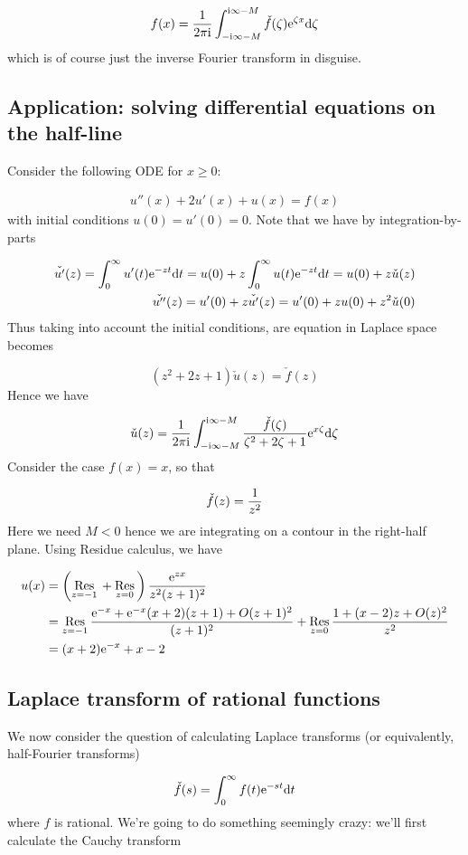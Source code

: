 \documentclass[12pt,a4paper]{article}
\def\D{ {\rm d} }
\def\I{ {\rm i} }
\def\E{ {\rm e} }
\def\Res_#1{\underset{#1}{\rm Res}\,}
\def\dt{\D t}
\begin{document}
\[
f(x) = {1 \over 2 \pi \I} \int_{-\I \infty - M}^{\I \infty - M}  \check f(\zeta) \E^{\zeta x} \D \zeta
\]
which is of course just the inverse Fourier transform in disguise.

\subsection{Application: solving differential equations on the half-line}
Consider the following ODE for $x \geq 0$:


\begin{align*}
u''(x) + 2u'(x) + u(x) = f(x)
\end{align*}
with initial conditions $u(0) = u'(0) = 0$. Note that we have by integration-by-parts


\begin{align*}
\check{u'}(z) = \int_0^\infty u'(t) \E^{-z t} \dt = u(0) + z \int_0^\infty u(t) \E^{-z t} \dt = u(0) + z \check u(z) \\
\check{u''}(z) = u'(0) + z \check{u'}(z) = u'(0) + z u(0) + z^2 \check u(0)
\end{align*}
Thus taking into account the initial conditions, are equation in Laplace space becomes

\[
(z^2 + 2z + 1) \check u(z) = \check f(z)
\]
Hence we have

\[
\check u(z) = {1 \over 2 \pi \I}\int_{-\I\infty-M}^{\I \infty-M} {\check f(\zeta) \over \zeta^2 + 2\zeta+1} \E^{x \zeta} \D \zeta 
\]
Consider the case $f(x) = x$, so that

\[
\check f(z) = {1 \over z^2}
\]
Here we need $M < 0$ hence we are integrating on a contour in the right-half plane.  Using Residue calculus, we have


\begin{align*}
u(x) &= \left(\Res_{z = -1} + \Res_{z=0}\right) {\E^{z x} \over z^2 (z +1)^2} \\
&= \Res_{z = -1}  {\E^{-x} +\E^{-x}(x+2) (z+1) +O(z+1)^2 \over  (z +1)^2} + \Res_{z=0} {1 + (x-2) z +O(z)^2 \over  z^2}  \\
 &= (x+2)\E^{-x} + x-2
 \end{align*}
\subsection{Laplace transform of rational functions}
We now consider the question of calculating Laplace transforms (or equivalently, half-Fourier transforms)

\[
\check f(s) = \int_0^\infty f(t) \E^{-s t} \D t
\]
where $f$ is rational. We're going to do something seemingly crazy: we'll first calculate the Cauchy transform
\end{document}
